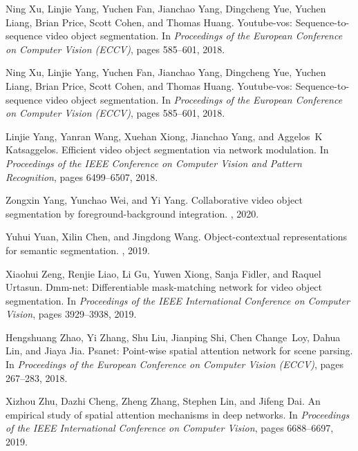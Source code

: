 \documentclass[final]{cvpr}
\begin{document}
{\begin{thebibliography}{10}
Ning Xu, Linjie Yang, Yuchen Fan, Jianchao Yang, Dingcheng Yue, Yuchen Liang,
  Brian Price, Scott Cohen, and Thomas Huang.
\newblock Youtube-vos: Sequence-to-sequence video object segmentation.
\newblock In {\em Proceedings of the European Conference on Computer Vision
  (ECCV)}, pages 585--601, 2018.

Ning Xu, Linjie Yang, Yuchen Fan, Jianchao Yang, Dingcheng Yue, Yuchen Liang,
  Brian Price, Scott Cohen, and Thomas Huang.
\newblock Youtube-vos: Sequence-to-sequence video object segmentation.
\newblock In {\em Proceedings of the European Conference on Computer Vision
  (ECCV)}, pages 585--601, 2018.

Linjie Yang, Yanran Wang, Xuehan Xiong, Jianchao Yang, and Aggelos~K
  Katsaggelos.
\newblock Efficient video object segmentation via network modulation.
\newblock In {\em Proceedings of the IEEE Conference on Computer Vision and
  Pattern Recognition}, pages 6499--6507, 2018.

Zongxin Yang, Yunchao Wei, and Yi Yang.
\newblock Collaborative video object segmentation by foreground-background
  integration.
, 2020.

Yuhui Yuan, Xilin Chen, and Jingdong Wang.
\newblock Object-contextual representations for semantic segmentation.
, 2019.

Xiaohui Zeng, Renjie Liao, Li Gu, Yuwen Xiong, Sanja Fidler, and Raquel
  Urtasun.
\newblock Dmm-net: Differentiable mask-matching network for video object
  segmentation.
\newblock In {\em Proceedings of the IEEE International Conference on Computer
  Vision}, pages 3929--3938, 2019.

Hengshuang Zhao, Yi Zhang, Shu Liu, Jianping Shi, Chen Change~Loy, Dahua Lin,
  and Jiaya Jia.
\newblock Psanet: Point-wise spatial attention network for scene parsing.
\newblock In {\em Proceedings of the European Conference on Computer Vision
  (ECCV)}, pages 267--283, 2018.

Xizhou Zhu, Dazhi Cheng, Zheng Zhang, Stephen Lin, and Jifeng Dai.
\newblock An empirical study of spatial attention mechanisms in deep networks.
\newblock In {\em Proceedings of the IEEE International Conference on Computer
  Vision}, pages 6688--6697, 2019.

\end{thebibliography}
 
}
\end{document}

